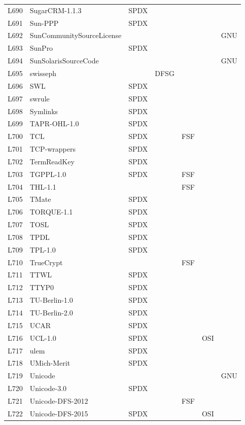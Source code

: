 \begin{longtable}[h]{m{2cm} | m{7cm} | c | c | c | c | c}
  L690 & SugarCRM-1.1.3 & SPDX &  &  &  &  \\
  L691 & Sun-PPP & SPDX &  &  &  &  \\
  L692 & SunCommunitySourceLicense &  &  &  &  & GNU \\
  L693 & SunPro & SPDX &  &  &  &  \\
  L694 & SunSolarisSourceCode &  &  &  &  & GNU \\
  L695 & swisseph &  & DFSG &  &  &  \\
  L696 & SWL & SPDX &  &  &  &  \\
  L697 & swrule & SPDX &  &  &  &  \\
  L698 & Symlinks & SPDX &  &  &  &  \\
  L699 & TAPR-OHL-1.0 & SPDX &  &  &  &  \\
  L700 & TCL & SPDX &  & FSF &  &  \\
  L701 & TCP-wrappers & SPDX &  &  &  &  \\
  L702 & TermReadKey & SPDX &  &  &  &  \\
  L703 & TGPPL-1.0 & SPDX &  & FSF &  &  \\
  L704 & THL-1.1 &  &  & FSF &  &  \\
  L705 & TMate & SPDX &  &  &  &  \\
  L706 & TORQUE-1.1 & SPDX &  &  &  &  \\
  L707 & TOSL & SPDX &  &  &  &  \\
  L708 & TPDL & SPDX &  &  &  &  \\
  L709 & TPL-1.0 & SPDX &  &  &  &  \\
  L710 & TrueCrypt &  &  & FSF &  &  \\
  L711 & TTWL & SPDX &  &  &  &  \\
  L712 & TTYP0 & SPDX &  &  &  &  \\
  L713 & TU-Berlin-1.0 & SPDX &  &  &  &  \\
  L714 & TU-Berlin-2.0 & SPDX &  &  &  &  \\
  L715 & UCAR & SPDX &  &  &  &  \\
  L716 & UCL-1.0 & SPDX &  &  & OSI &  \\
  L717 & ulem & SPDX &  &  &  &  \\
  L718 & UMich-Merit & SPDX &  &  &  &  \\
  L719 & Unicode &  &  &  &  & GNU \\
  L720 & Unicode-3.0 & SPDX &  &  &  &  \\
  L721 & Unicode-DFS-2012 &  &  & FSF &  &  \\
  L722 & Unicode-DFS-2015 & SPDX &  &  & OSI &  \\

\end{longtable}

